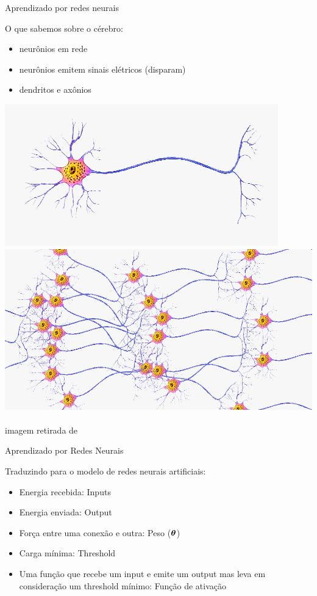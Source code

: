 \documentclass[10pt]{beamer}
\begin{document}
\begin{frame}{Aprendizado por redes neurais}

O que sabemos sobre o cérebro:
\vspace{0.2cm}
\begin{itemize}
\item neurônios em rede
\vspace{0.2cm}
\item  neurônios emitem sinais elétricos (disparam)
\vspace{0.2cm}
\item dendritos e axônios


\end{itemize}

\includegraphics[width=.50\textwidth]{images/neuron.png}
\includegraphics[width=.50\textwidth]{images/neuronsnetwork.png}
\\
\\
\footnotesize{imagem retirada de \cite{metodosupera}}


\end{frame}



\begin{frame}{Aprendizado por Redes Neurais}

Traduzindo para o modelo de redes neurais artificiais:
\vspace{0.2cm}
\begin{itemize}
\item Energia recebida: \alert{Inputs}
\vspace{0.2cm}
\item  Energia enviada: \alert{Output}
\vspace{0.2cm}
\item  Força entre uma conexão e outra: \alert{Peso ($\bm{\theta}$)}
\vspace{0.2cm}

\item Carga mínima: \alert{Threshold}
\vspace{0.2cm}
\item Uma função que recebe um input e emite um output mas leva em consideração um threshold mínimo: \alert{Função de ativação}
\end{itemize}
\end{frame}
\end{document}
